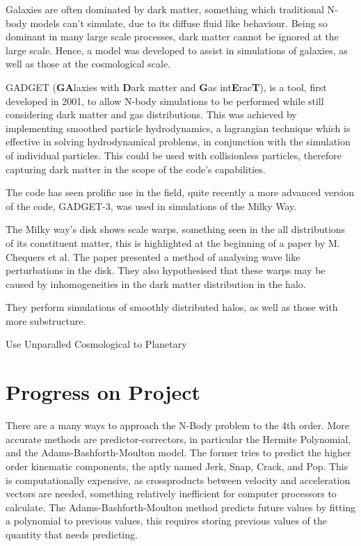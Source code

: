 \documentclass[a4paper,10pt]{article}
\begin{document}
Galaxies are often dominated by dark matter, something which traditional N-body models can't simulate, due to its diffuse fluid like behaviour. Being so dominant in many large scale processes, dark matter cannot be ignored at the large scale. Hence, a model was developed to assist in simulations of galaxies, as well as those at the cosmological scale. 

GADGET (\textbf{GA}laxies with \textbf{D}ark matter and \textbf{G}as int\textbf{E}rac\textbf{T}), is a tool, first developed in 2001, to allow N-body simulations to be performed while still considering dark matter and gas distributions. This was achieved by implementing smoothed particle hydrodynamics, a lagrangian technique which is effective in solving hydrodynamical problems, in conjunction with the simulation of individual particles. This could be used with collisionless particles, therefore capturing dark matter in the scope of the code's capabilities. 

The code has seen prolific use in the field, quite recently a more advanced version of the code, GADGET-3, was used in simulations of the Milky Way. 

The Milky way's disk shows scale warps, something seen in the all distributions of its constituent matter, this is highlighted at the beginning of a paper by M. Chequers et al. The paper presented a method of analysing wave like perturbations in the disk. They also hypothesised that these warps may be caused by inhomogeneities in the dark matter distribution in the halo. 

They perform simulations of smoothly distributed halos, as well as those with more substructure.



Use Unparalled 
Cosmological to Planetary


\section{Progress on Project}

There are a many ways to approach the N-Body problem to the 4th order. More accurate methods are predictor-correctors, in particular the Hermite Polynomial, and the Adams-Bashforth-Moulton model. The former tries to predict the higher order kinematic components, the aptly named Jerk, Snap, Crack, and Pop. This is computationally expensive, as crossproducts between velocity and acceleration vectors are needed, something relatively inefficient for computer processors to calculate. The Adams-Bashforth-Moulton method predicts future values by fitting a polynomial to previous values, this requires storing previous values of the quantity that needs predicting. 
\end{document}
